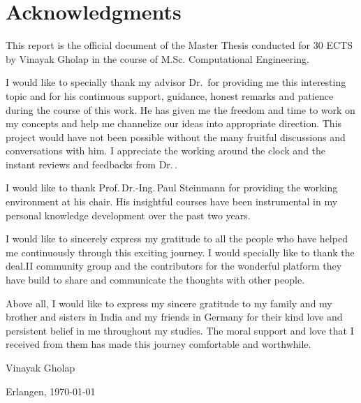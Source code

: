\chapter*{Acknowledgments}
\indent This report is the official document of the Master Thesis conducted for 30 ECTS by Vinayak Gholap in the course of M.Sc. Computational Engineering. \par
I would like to specially thank my advisor Dr.\, for providing me this interesting topic and for his continuous support, guidance, honest remarks and patience during the course of this work. He has given me the freedom and time to work on my concepts and help me channelize our ideas into appropriate direction. This project would have not been possible without the many fruitful discussions and conversations with him. I appreciate the working around the clock and the instant reviews and feedbacks from Dr.\,. \par  
I would like to thank Prof.\,Dr.-Ing.\,Paul Steinmann for providing the working environment at his chair. His insightful courses have been instrumental in my personal knowledge development over the past two years. \par 
I would like to sincerely express my gratitude to all the people who have helped me continuously through this exciting journey. I would specially like to thank the deal.II community group and the contributors for the wonderful platform they have build to share and communicate the thoughts with other people.  \par 
Above all, I would like to express my sincere gratitude to my family and my brother and sisters in India and my friends in Germany for their kind love and persistent belief in me throughout my studies. The moral support and love that I received from them has made this journey comfortable and worthwhile. \newline\par 

\noindent Vinayak Gholap \par 
\noindent Erlangen, \today

